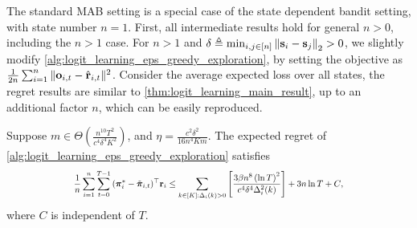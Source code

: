 The standard MAB setting is a special case of the state dependent bandit setting, with state number $n = 1$. First, all intermediate results hold for general $n > 0$, including the $n > 1$ case. For $n > 1$ and $\delta \triangleq \min_{i, j \in [n]}{\left\| {\mathbf{s}}_i - {\mathbf{s}}_j \right\|_2} > 0$, we slightly modify \cref{alg:logit_learning_eps_greedy_exploration}, by setting the objective as $\frac{1}{2n}\sum_{i=1}^{n}{ \| {\mathbf{o}}_{i, t} - \hat{{\mathbf{r}}}_{i,t} \|^2}$. Consider the average expected loss over all states, the regret results are similar to \cref{thm:logit_learning_main_result}, up to an additional factor $n$, which can be easily reproduced.
\begin{thm}
\label{thm:many_state_dependent_bandit_setting}
     Suppose $m \in \Theta\left( \frac{n^{10} T^2}{c^4 \delta^4 K^2} \right)$, and $\eta = \frac{c^2 \delta^2}{16 n^4 K m}$. The expected regret of \cref{alg:logit_learning_eps_greedy_exploration} satisfies
\begin{equation*}
\scalemath{0.78}{
	\frac{1}{n } \sum\limits_{i=1}^{n}{ \sum\limits_{t=0}^{T-1}{ ( {\rvpi_i^*} - \tilde{\rvpi}_{i, t})^\top \rvr_i  } \le \sum\limits_{k \in [K] : \Delta_i(k) > 0}{ \left[ \frac{ 3 \beta n^8 \left( \ln{T} \right)^2}{c^4 \delta^4 \Delta_i^2(k)} \right] } + 3 n \ln{T} + C },
}
\end{equation*}
where $C$ is independent of $T$.
\end{thm}


